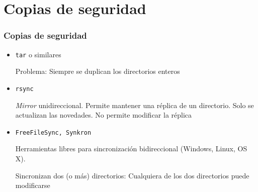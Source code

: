\documentclass[ucs]{beamer}
\begin{document}



%





\section{Copias de seguridad}
\begin{frame}[fragile]
\frametitle{Copias de seguridad}

\begin{itemize}	
\item
\verb|tar| o similares

Problema: Siempre se duplican los directorios enteros
\item 
\verb|rsync|

\emph{Mirror} unidireccional. Permite mantener una réplica 
de un directorio. Solo se actualizan las novedades.
No permite modificar la réplica
\item 
\verb|FreeFileSync, Synkron|

Herramientas libres para sincronización bidireccional (Windows, Linux, OS X). 

Sincronizan dos (o más) directorios: Cualquiera de los dos directorios puede modificarse

\end{itemize}
\end{frame}
\end{document}
